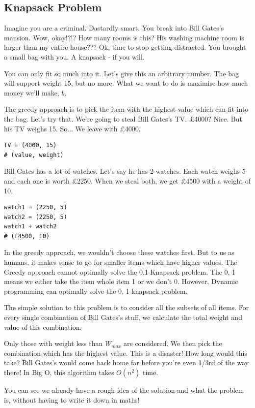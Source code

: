 \documentclass{article}
\begin{document}
\subsection{Knapsack Problem}
Imagine you are a criminal. Dastardly smart. You break into Bill Gates’s mansion. Wow, okay!?!? How many rooms is this? His washing machine room is larger than my entire house??? Ok, time to stop getting distracted. You brought a small bag with you. A knapsack - if you will. 

You can only fit so much into it. Let’s give this an arbitrary number. The bag will support weight 15, but no more. What we want to do is maximise how much money we'll make, $b$.

The greedy approach is to pick the item with the highest value which can fit into the bag. Let's try that. We're going to steal Bill Gates's TV. £4000? Nice. But his TV weighs 15. So... We leave with £4000.
\begin{verbatim}
TV = (4000, 15)
# (value, weight)
\end{verbatim}
Bill Gates has a lot of watches. Let's say he has 2 watches. Each watch weighs 5 and each one is worth £2250. When we steal both, we get £4500 with a weight of 10.
\begin{verbatim}
watch1 = (2250, 5)
watch2 = (2250, 5)
watch1 + watch2
# (£4500, 10)
\end{verbatim}
In the greedy approach, we wouldn't choose these watches first. But to us as humans, it makes sense to go for smaller items which have higher values. The Greedy approach cannot optimally solve the {0,1} Knapsack problem. The {0, 1} means we either take the item whole item {1} or we don't {0}. However, Dynamic programming can optimally solve the {0, 1} knapsack problem.

The simple solution to this problem is to consider all the subsets of all items. For every single combination of Bill Gates's stuff, we calculate the total weight and value of this combination.

Only those with weight less than $W_{max}$ are considered. We then pick the combination which has the highest value. This is a disaster! How long would this take? Bill Gates's would come back home far before you're even 1/3rd of the way there! In Big O, this algorithm takes $O(n^2)$ time.

You can see we already have a rough idea of the solution and what the problem is, without having to write it down in maths!
\newpage
\end{document}
